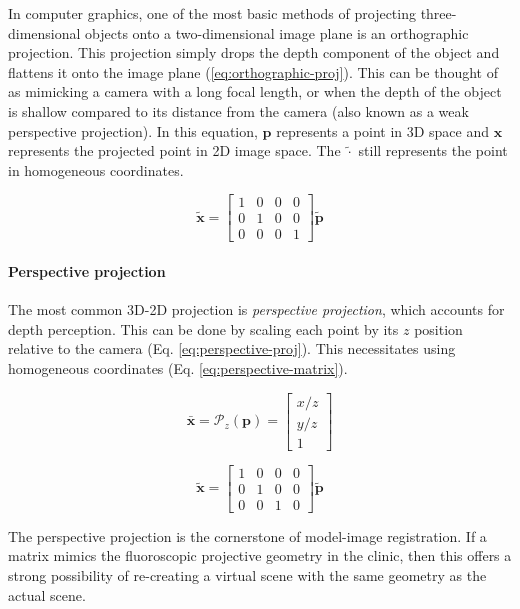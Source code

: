 In computer graphics, one of the most basic methods of projecting three-dimensional objects onto a two-dimensional image plane is an orthographic projection. This projection simply drops the depth component of the object and flattens it onto the image plane (\cref{eq:orthographic-proj}). This can be thought of as mimicking a camera with a long focal length, or when the depth of the object is shallow compared to its distance from the camera (also known as a weak perspective projection). In this equation, $\mathbf{p}$ represents a point in 3D space and $\mathbf{x}$ represents the projected point in 2D image space. The $\tilde{\cdot}$ still represents the point in homogeneous coordinates.

\begin{equation}
    \tilde{\mathbf{x}} = \begin{bmatrix}
        1 & 0 & 0 & 0 \\ 0 & 1 & 0 & 0 \\ 0 & 0 & 0 & 1
    \end{bmatrix}\tilde{\mathbf{p}}
    \label{eq:orthographic-proj}
\end{equation}

\paragraph*{Perspective projection}
The most common 3D-2D projection is \emph{perspective projection}, which accounts for depth perception. This can be done by scaling each point by its $z$ position relative to the camera (Eq. \ref{eq:perspective-proj}). This necessitates using homogeneous coordinates (Eq. \ref{eq:perspective-matrix}).

\begin{equation}
    \bar{\mathbf{x}} = \mathcal{P}_z(\mathbf{p}) = \begin{bmatrix}
        x/z \\ y/z \\ 1
    \end{bmatrix}
    \label{eq:perspective-proj}
\end{equation}

\begin{equation}
    \tilde{\mathbf{x}} = \begin{bmatrix}
        1 & 0 & 0 & 0 \\ 0 & 1 & 0 & 0 \\ 0 & 0 & 1 & 0 
    \end{bmatrix}\tilde{\mathbf{p}}
    \label{eq:perspective-matrix}
\end{equation}

The perspective projection is the cornerstone of model-image registration. If a matrix mimics the fluoroscopic projective geometry in the clinic, then this offers a strong possibility of re-creating a virtual scene with the same geometry as the actual scene.

